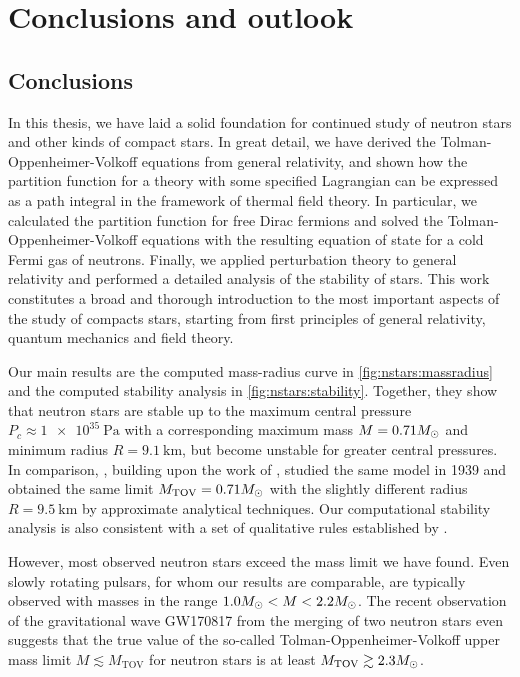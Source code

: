 \chapter{Conclusions and outlook}
\label{chap:conclusion}

\section{Conclusions}

In this thesis, we have laid a solid foundation for continued study of neutron stars and other kinds of compact stars.
In great detail, we have derived the Tolman-Oppenheimer-Volkoff equations from general relativity, and shown how the partition function for a theory with some specified Lagrangian can be expressed as a path integral in the framework of thermal field theory.
In particular, we calculated the partition function for free Dirac fermions and solved the Tolman-Oppenheimer-Volkoff equations with the resulting equation of state for a cold Fermi gas of neutrons.
Finally, we applied perturbation theory to general relativity and performed a detailed analysis of the stability of stars.
This work constitutes a broad and thorough introduction to the most important aspects of the study of compacts stars, starting from first principles of general relativity, quantum mechanics and field theory.

Our main results are the computed mass-radius curve in \cref{fig:nstars:massradius} and the computed stability analysis in \cref{fig:nstars:stability}.
Together, they show that neutron stars are stable up to the maximum central pressure $P_c \approx \SI{1e35}{\pascal} $ with a corresponding maximum mass $M = 0.71 M_\odot$ and minimum radius $R = \SI{9.1}{\kilo\meter}$, but become unstable for greater central pressures.
In comparison, \cite{ref:tov}, building upon the work of \cite{ref:tolman}, studied the same model in 1939 and obtained the same limit $M_\text{TOV} = 0.71 M_\odot$ with the slightly different radius $R = \SI{9.5}{\kilo\meter}$ by approximate analytical techniques.
Our computational stability analysis is also consistent with a set of qualitative rules established by \cite{ref:stability_methods}.

However, most observed neutron stars exceed the mass limit we have found.
Even slowly rotating pulsars, for whom our results are comparable, \cite[section 2.1]{ref:neutron_star_physics} are typically observed with masses in the range $1.0 M_\odot < M < 2.2 M_\odot$. \cite[figure 2 and 3]{ref:neutron_star_masses_paper}
The recent observation of the gravitational wave GW170817 from the merging of two neutron stars even suggests that the true value of the so-called Tolman-Oppenheimer-Volkoff upper mass limit $M \lesssim M_\text{TOV}$ for neutron stars is at least $M_\text{TOV} \gtrsim 2.3 M_\odot$. \cite{ref:gravitational_wave_tov_limit}

